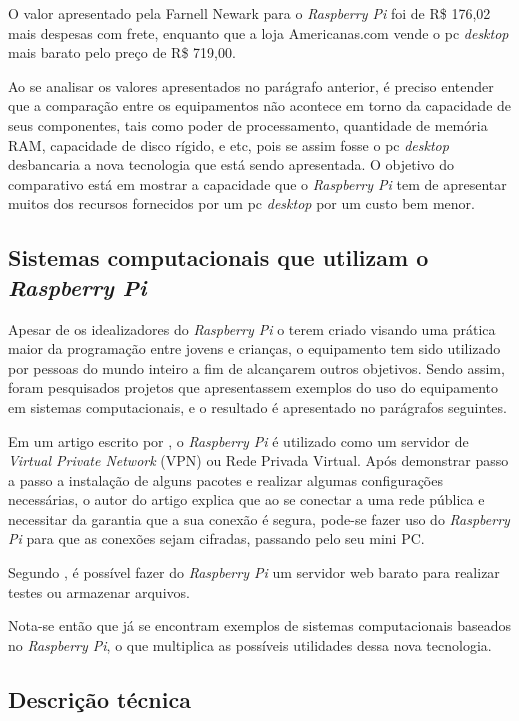 O valor apresentado pela Farnell Newark para o \textit{Raspberry Pi} foi de R\$ 176,02 mais despesas com frete, enquanto que a loja Americanas.com vende o pc \textit{desktop} mais barato pelo preço de R\$ 719,00.

Ao se analisar os valores apresentados no parágrafo anterior, é preciso entender que a comparação entre os equipamentos não acontece em torno da capacidade de seus componentes, tais como poder de processamento, quantidade de memória RAM, capacidade de disco rígido, e etc, pois se assim fosse o pc \textit{desktop} desbancaria a nova tecnologia que está sendo apresentada. O objetivo do comparativo está em mostrar a capacidade que o \textit{Raspberry Pi} tem de apresentar muitos dos recursos fornecidos por um pc \textit{desktop} por um custo bem menor.

\subsection{Sistemas computacionais que utilizam o \textit{Raspberry Pi}}

Apesar de os idealizadores do \textit{Raspberry Pi} o terem criado visando uma prática maior da programação entre jovens e crianças, o equipamento tem sido utilizado por pessoas do mundo inteiro a fim de alcançarem outros objetivos. Sendo assim, foram pesquisados projetos que apresentassem exemplos do uso do equipamento em sistemas computacionais, e o resultado é apresentado no parágrafos seguintes.

Em um artigo escrito por , o \textit{Raspberry Pi} é utilizado como um servidor de \textit{Virtual Private Network} (VPN) ou Rede Privada Virtual. Após demonstrar passo a passo a instalação de alguns pacotes e realizar algumas configurações necessárias, o autor do artigo explica que ao se conectar a uma rede pública e necessitar da garantia que a sua conexão é segura, pode-se fazer uso do \textit{Raspberry Pi} para que as conexões sejam cifradas, passando pelo seu mini PC.

Segundo , é possível fazer do \textit{Raspberry Pi} um servidor web barato para realizar testes ou armazenar arquivos.

Nota-se então que já se encontram exemplos de sistemas computacionais baseados no \textit{Raspberry Pi}, o que multiplica as possíveis utilidades dessa nova tecnologia.

\subsection{Descrição técnica}

